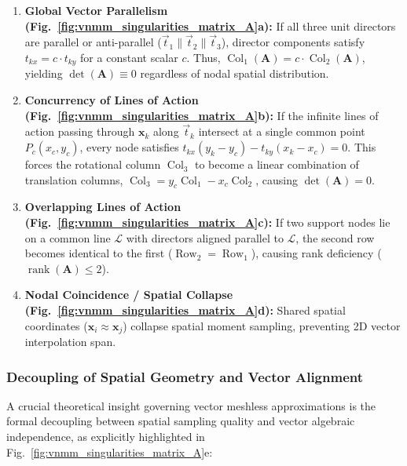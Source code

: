 \documentclass[preprint,12pt]{elsarticle}
\begin{document}
\begin{enumerate}
    \item \textbf{Global Vector Parallelism (Fig.~\ref{fig:vnmm_singularities_matrix_A}a):} If all three unit directors are parallel or anti-parallel ($\vec{t}_1 \parallel \vec{t}_2 \parallel \vec{t}_3$), director components satisfy $t_{kx} = c \cdot t_{ky}$ for a constant scalar $c$. Thus, $\operatorname{Col}_1(\mathbf{A}) = c \cdot \operatorname{Col}_2(\mathbf{A})$, yielding $\det(\mathbf{A}) \equiv 0$ regardless of nodal spatial distribution.
    
    \item \textbf{Concurrency of Lines of Action (Fig.~\ref{fig:vnmm_singularities_matrix_A}b):} If the infinite lines of action passing through $\mathbf{x}_k$ along $\vec{t}_k$ intersect at a single common point $P_c(x_c, y_c)$, every node satisfies $t_{kx}(y_k - y_c) - t_{ky}(x_k - x_c) = 0$. This forces the rotational column $\operatorname{Col}_3$ to become a linear combination of translation columns, $\operatorname{Col}_3 = y_c \operatorname{Col}_1 - x_c \operatorname{Col}_2$, causing $\det(\mathbf{A}) = 0$.
    
    \item \textbf{Overlapping Lines of Action (Fig.~\ref{fig:vnmm_singularities_matrix_A}c):} If two support nodes lie on a common line $\mathcal{L}$ with directors aligned parallel to $\mathcal{L}$, the second row becomes identical to the first ($\operatorname{Row}_2 = \operatorname{Row}_1$), causing rank deficiency ($\operatorname{rank}(\mathbf{A}) \le 2$).
    
    \item \textbf{Nodal Coincidence / Spatial Collapse (Fig.~\ref{fig:vnmm_singularities_matrix_A}d):} Shared spatial coordinates ($\mathbf{x}_i \approx \mathbf{x}_j$) collapse spatial moment sampling, preventing 2D vector interpolation span.
\end{enumerate}

\subsubsection{Decoupling of Spatial Geometry and Vector Alignment}
\label{subsubsec:decoupling_L1}

A crucial theoretical insight governing vector meshless approximations is the formal decoupling between spatial sampling quality and vector algebraic independence, as explicitly highlighted in Fig.~\ref{fig:vnmm_singularities_matrix_A}e:
\end{document}
